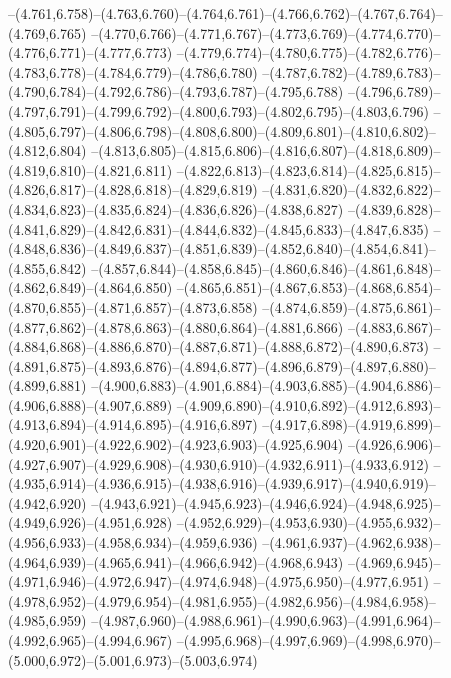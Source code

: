   --(4.761,6.758)--(4.763,6.760)--(4.764,6.761)--(4.766,6.762)--(4.767,6.764)--(4.769,6.765)%
  --(4.770,6.766)--(4.771,6.767)--(4.773,6.769)--(4.774,6.770)--(4.776,6.771)--(4.777,6.773)%
  --(4.779,6.774)--(4.780,6.775)--(4.782,6.776)--(4.783,6.778)--(4.784,6.779)--(4.786,6.780)%
  --(4.787,6.782)--(4.789,6.783)--(4.790,6.784)--(4.792,6.786)--(4.793,6.787)--(4.795,6.788)%
  --(4.796,6.789)--(4.797,6.791)--(4.799,6.792)--(4.800,6.793)--(4.802,6.795)--(4.803,6.796)%
  --(4.805,6.797)--(4.806,6.798)--(4.808,6.800)--(4.809,6.801)--(4.810,6.802)--(4.812,6.804)%
  --(4.813,6.805)--(4.815,6.806)--(4.816,6.807)--(4.818,6.809)--(4.819,6.810)--(4.821,6.811)%
  --(4.822,6.813)--(4.823,6.814)--(4.825,6.815)--(4.826,6.817)--(4.828,6.818)--(4.829,6.819)%
  --(4.831,6.820)--(4.832,6.822)--(4.834,6.823)--(4.835,6.824)--(4.836,6.826)--(4.838,6.827)%
  --(4.839,6.828)--(4.841,6.829)--(4.842,6.831)--(4.844,6.832)--(4.845,6.833)--(4.847,6.835)%
  --(4.848,6.836)--(4.849,6.837)--(4.851,6.839)--(4.852,6.840)--(4.854,6.841)--(4.855,6.842)%
  --(4.857,6.844)--(4.858,6.845)--(4.860,6.846)--(4.861,6.848)--(4.862,6.849)--(4.864,6.850)%
  --(4.865,6.851)--(4.867,6.853)--(4.868,6.854)--(4.870,6.855)--(4.871,6.857)--(4.873,6.858)%
  --(4.874,6.859)--(4.875,6.861)--(4.877,6.862)--(4.878,6.863)--(4.880,6.864)--(4.881,6.866)%
  --(4.883,6.867)--(4.884,6.868)--(4.886,6.870)--(4.887,6.871)--(4.888,6.872)--(4.890,6.873)%
  --(4.891,6.875)--(4.893,6.876)--(4.894,6.877)--(4.896,6.879)--(4.897,6.880)--(4.899,6.881)%
  --(4.900,6.883)--(4.901,6.884)--(4.903,6.885)--(4.904,6.886)--(4.906,6.888)--(4.907,6.889)%
  --(4.909,6.890)--(4.910,6.892)--(4.912,6.893)--(4.913,6.894)--(4.914,6.895)--(4.916,6.897)%
  --(4.917,6.898)--(4.919,6.899)--(4.920,6.901)--(4.922,6.902)--(4.923,6.903)--(4.925,6.904)%
  --(4.926,6.906)--(4.927,6.907)--(4.929,6.908)--(4.930,6.910)--(4.932,6.911)--(4.933,6.912)%
  --(4.935,6.914)--(4.936,6.915)--(4.938,6.916)--(4.939,6.917)--(4.940,6.919)--(4.942,6.920)%
  --(4.943,6.921)--(4.945,6.923)--(4.946,6.924)--(4.948,6.925)--(4.949,6.926)--(4.951,6.928)%
  --(4.952,6.929)--(4.953,6.930)--(4.955,6.932)--(4.956,6.933)--(4.958,6.934)--(4.959,6.936)%
  --(4.961,6.937)--(4.962,6.938)--(4.964,6.939)--(4.965,6.941)--(4.966,6.942)--(4.968,6.943)%
  --(4.969,6.945)--(4.971,6.946)--(4.972,6.947)--(4.974,6.948)--(4.975,6.950)--(4.977,6.951)%
  --(4.978,6.952)--(4.979,6.954)--(4.981,6.955)--(4.982,6.956)--(4.984,6.958)--(4.985,6.959)%
  --(4.987,6.960)--(4.988,6.961)--(4.990,6.963)--(4.991,6.964)--(4.992,6.965)--(4.994,6.967)%
  --(4.995,6.968)--(4.997,6.969)--(4.998,6.970)--(5.000,6.972)--(5.001,6.973)--(5.003,6.974)%
